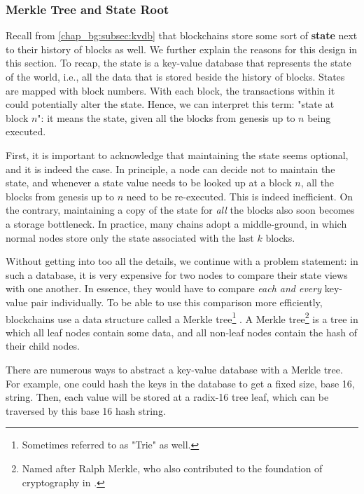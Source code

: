 \subsubsection{Merkle Tree and State Root} \label{chap_bg:subsec:trie}

Recall from \ref{chap_bg:subsec:kvdb} that blockchains store some sort of \textbf{state} next to
their history of blocks as well. We further explain the reasons for this design in this section. To
recap, the state is a key-value database that represents the state of the world, i.e., all the data
that is stored beside the history of blocks. States are mapped with block numbers. With each block,
the transactions within it could potentially alter the state. Hence, we can interpret this term:
"state at block $n$": it means the state, given all the blocks from genesis up to $n$ being
executed.

First, it is important to acknowledge that maintaining the state seems optional, and it is indeed
the case. In principle, a node can decide not to maintain the state, and whenever a state value
needs to be looked up at a block $n$, all the blocks from genesis up to $n$ need to be re-executed.
This is indeed inefficient. On the contrary, maintaining a copy of the state for \textit{all} the
blocks also soon becomes a storage bottleneck. In practice, many chains adopt a middle-ground, in
which normal nodes store only the state associated with the last $k$ blocks.

Without getting into too all the details, we continue with a problem statement: in such a database,
it is very expensive for two nodes to compare their state views with one another. In essence, they
would have to compare \textit{each and every} key-value pair individually. To be able to use this
comparison more efficiently, blockchains use a data structure called a Merkle
tree\footnote{Sometimes referred to as "Trie" as well.} \cite{merkleDigitalSignatureBased1988}. A
Merkle tree\footnote{Named after Ralph Merkle, who also contributed to the foundation of
cryptography in \cite{merkleSecureCommunicationsInsecure1978}.} is a tree in which all leaf nodes
contain some data, and all non-leaf nodes contain the hash of their child nodes.

There are numerous ways to abstract a key-value database with a Merkle tree. For example, one could
hash the keys in the database to get a fixed size, base 16, string. Then, each value will be stored
at a radix-16 tree leaf, which can be traversed by this base 16 hash string.

